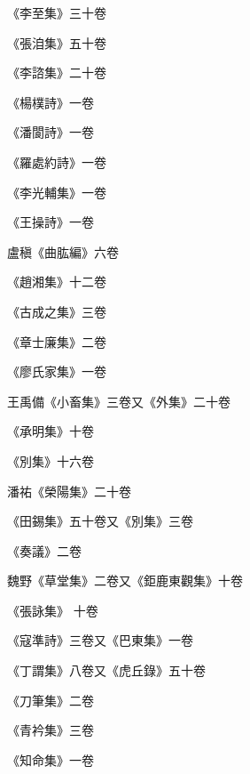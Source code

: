 \begin{pinyinscope}
 《李至集》三十卷



 《張洎集》五十卷



 《李諮集》二十卷



 《楊樸詩》一卷



 《潘閬詩》一卷



 《羅處約詩》一卷



 《李光輔集》一卷



 《王操詩》一卷



 盧稹《曲肱編》六卷



 《趙湘集》十二卷



 《古成之集》三卷



 《章士廉集》二卷



 《廖氏家集》一卷



 王禹備《小畜集》三卷又《外集》二十卷



 《承明集》十卷



 《別集》十六卷



 潘祐《榮陽集》二十卷



 《田錫集》五十卷又《別集》三卷



 《奏議》二卷



 魏野《草堂集》二卷又《鉅鹿東觀集》十卷



 《張詠集》
 十卷



 《寇準詩》三卷又《巴東集》一卷



 《丁謂集》八卷又《虎丘錄》五十卷



 《刀筆集》二卷



 《青衿集》三卷



 《知命集》一卷




\end{pinyinscope}
